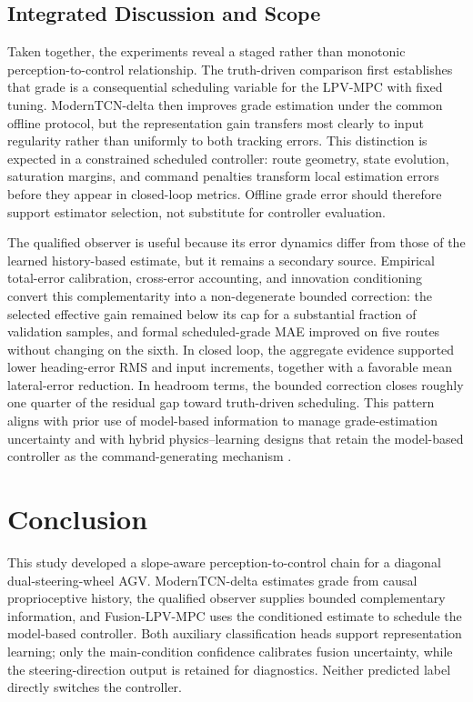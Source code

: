 \documentclass{ieeeaccess}
\newcommand{\citep}[1]{\cite{#1}}
\begin{document}
\subsection{Integrated Discussion and Scope}

Taken together, the experiments reveal a staged rather than monotonic perception-to-control relationship. The truth-driven comparison first establishes that grade is a consequential scheduling variable for the LPV-MPC with fixed tuning. ModernTCN-delta then improves grade estimation under the common offline protocol, but the representation gain transfers most clearly to input regularity rather than uniformly to both tracking errors. This distinction is expected in a constrained scheduled controller: route geometry, state evolution, saturation margins, and command penalties transform local estimation errors before they appear in closed-loop metrics. Offline grade error should therefore support estimator selection, not substitute for controller evaluation.

The qualified observer is useful because its error dynamics differ from those of the learned history-based estimate, but it remains a secondary source. Empirical total-error calibration, cross-error accounting, and innovation conditioning convert this complementarity into a non-degenerate bounded correction: the selected effective gain remained below its cap for a substantial fraction of validation samples, and formal scheduled-grade MAE improved on five routes without changing on the sixth. In closed loop, the aggregate evidence supported lower heading-error RMS and input increments, together with a favorable mean lateral-error reduction. In headroom terms, the bounded correction closes roughly one quarter of the residual gap toward truth-driven scheduling. This pattern aligns with prior use of model-based information to manage grade-estimation uncertainty \citep{Liu2023RoadSlopeAAIMM,Gao2024RoadSlopeHDV} and with hybrid physics--learning designs that retain the model-based controller as the command-generating mechanism \citep{Zheng2024HybridPhysicsLearningUSV}.

\section{Conclusion}
\label{sec:conclusion}

This study developed a slope-aware perception-to-control chain for a diagonal dual-steering-wheel AGV. ModernTCN-delta estimates grade from causal proprioceptive history, the qualified observer supplies bounded complementary information, and Fusion-LPV-MPC uses the conditioned estimate to schedule the model-based controller. Both auxiliary classification heads support representation learning; only the main-condition confidence calibrates fusion uncertainty, while the steering-direction output is retained for diagnostics. Neither predicted label directly switches the controller.
\end{document}
